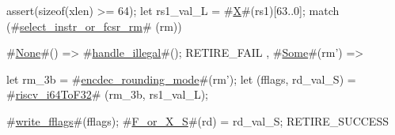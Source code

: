 assert(sizeof(xlen) >= 64);
let rs1_val_L = #\hyperref[sailRISCVzX]{X}#(rs1)[63..0];
match (#\hyperref[sailRISCVzselectzyinstrzyorzyfcsrzyrm]{select\_instr\_or\_fcsr\_rm}# (rm)) {
  #\hyperref[sailRISCVzNone]{None}#() => { #\hyperref[sailRISCVzhandlezyillegal]{handle\_illegal}#(); RETIRE_FAIL },
  #\hyperref[sailRISCVzSome]{Some}#(rm') => {
    let rm_3b = #\hyperref[sailRISCVzencdeczyroundingzymode]{encdec\_rounding\_mode}#(rm');
    let (fflags, rd_val_S) = #\hyperref[sailRISCVzriscvzyi64ToF32]{riscv\_i64ToF32}# (rm_3b, rs1_val_L);

    #\hyperref[sailRISCVzwritezyfflags]{write\_fflags}#(fflags);
    #\hyperref[sailRISCVzFzyorzyXzyS]{F\_or\_X\_S}#(rd) = rd_val_S;
    RETIRE_SUCCESS
  }
}
